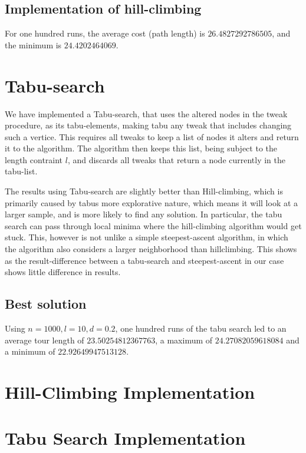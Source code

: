 \documentclass{article}
\begin{document}
\subsection{Implementation of hill-climbing}

For one hundred runs, the average cost (path length) is
$26.4827292786505$, and the minimum is $24.4202464069$.

\section{Tabu-search}
We have implemented a Tabu-search, that uses the altered nodes in the tweak procedure,
as its tabu-elements, making tabu any tweak that includes changing such a vertice.
This requires all tweaks to keep a list of nodes it alters and return it to the algorithm.
The algorithm then keeps this list, being subject to the length contraint $l$, and discards all tweaks that return
a node currently in the tabu-list.

The results using Tabu-search are slightly better than Hill-climbing,
which is primarily caused by tabus more explorative nature, which
means it will look at a larger sample, and is more likely to find any
solution.  In particular, the tabu search can pass through local
minima where the hill-climbing algorithm would get stuck.  This,
however is not unlike a simple steepest-ascent algorithm, in which the
algorithm also considers a larger neighborhood than hillclimbing. This
shows as the result-difference between a tabu-search and
steepest-ascent in our case shows little difference in results.

\subsection{Best solution}

Using $n=1000,l=10,d=0.2$, one hundred runs of the tabu search led to
an average tour length of $23.50254812367763$, a maximum of
$24.27082059618084$ and a minimum of $22.92649947513128$.

\appendix

\section{Hill-Climbing Implementation}



\section{Tabu Search Implementation}


\end{document}
